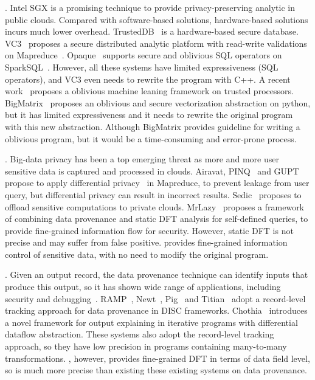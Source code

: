 . Intel SGX is a promising technique 
to provide privacy-preserving analytic in public clouds. Compared with 
software-based solutions, hardware-based solutions incurs much lower overhead. 
TrustedDB~\cite{trusteddb:sigmod11} is a hardware-based secure database.
VC3~\cite{vc3:sp15} proposes a secure distributed analytic platform
with read-write validations on Mapreduce~\cite{mapreduce}. 
Opaque~\cite{opaque:nsdi17} supports secure and oblivious SQL operators on 
SparkSQL~\cite{sparksql:sigmod15}. However, all these systems have limited 
expressiveness (\eg SQL operators), and VC3 even needs to rewrite the program 
with C++. A recent work~\cite{oblivious:security16} proposes a oblivious 
machine leaning framework on trusted processors. 
BigMatrix~\cite{bigmatrix:ccs17} proposes an oblivious and secure vectorization
abstraction on python, but it has limited expressiveness and it needs to
rewrite the original program with this new abstraction. Although BigMatrix 
provides guideline for writing a oblivious program, but it would be a 
time-consuming and error-prone process.


. Big-data privacy has been a top 
emerging threat as more and more user sensitive data is captured and processed 
in clouds. Airavat\cite{airavat:nsdi10}, PINQ~\cite{pinq:sigmod09} and 
GUPT~\cite{gupt:sigmod12} propose to apply differential 
privacy~\cite{noise:tcc06,differential:focs07} in Mapreduce,
to prevent leakage from user query, but differential privacy can result in 
incorrect results. Sedic~\cite{sedic:cloud13} proposes to offload sensitive 
computations to private clouds. MrLazy~\cite{hotcloud14:mrlazy}
proposes a framework of combining data provenance and static DFT analysis for 
self-defined queries, to provide fine-grained information flow for security. 
However, static DFT is not precise and may suffer from false positive. \kakute 
provides fine-grained information control of sensitive data, with no need to 
modify the original program.

. Given an output record, the data provenance technique 
can identify inputs that produce this output, so it has shown wide range of 
applications, including security and 
debugging~\cite{icse16:bigdebug,dtap:vldb12}.
RAMP~\cite{ramp:cidr11}, Newt~\cite{newt:socc13}, 
Pig~\cite{pig:dataflow:pvldb12} and Titian~\cite{vldb15:titian}
adopt a record-level tracking approach for data provenance in DISC frameworks.
Chothia~\cite{vldb16:output} introduces a novel framework for output explaining 
in iterative programs with differential dataflow abstraction. These systems 
also adopt the record-level tracking approach, so they have low precision in 
programs containing many-to-many transformations. \kakute, however, provides 
fine-grained DFT in terms of data field level, so \kakute is much more 
precise than existing these existing systems on data provenance.


